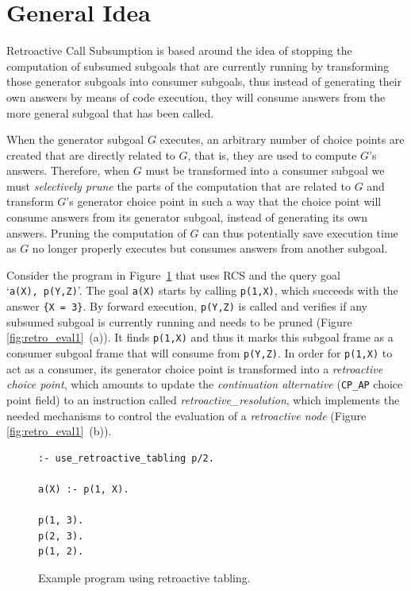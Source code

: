 \section{General Idea}

Retroactive Call Subsumption is based around the idea of stopping the computation of subsumed subgoals
that are currently running by transforming those generator subgoals into consumer subgoals, thus instead
of generating their own answers by means of code execution, they will consume answers from the more general
subgoal that has been called.

When the generator subgoal $G$ executes, an arbitrary number of choice points are created that are directly related
to $G$, that is, they are used to compute $G$'s answers. Therefore, when $G$
must be transformed into a consumer subgoal we must \textit{selectively prune} the parts of the computation
that are related to $G$ and transform $G$'s generator choice point in such a way that the choice point
will consume answers from its generator subgoal, instead of generating its own answers.
Pruning the computation of $G$ can thus potentially save execution time as $G$ no longer properly executes
but consumes answers from another subgoal.

Consider the program in Figure~\ref{fig:retro_program1} that uses RCS and the query goal `\texttt{a(X),~p(Y,Z)}'.
The goal \texttt{a(X)} starts by calling \texttt{p(1,X)}, which succeeds with the answer \texttt{\{X~=~3\}}.
By forward execution, \texttt{p(Y,Z)} is called and verifies if any subsumed subgoal is currently running
and needs to be pruned (Figure \ref{fig:retro_eval1}~(a)). It finds \texttt{p(1,X)} and thus it marks this subgoal frame as a consumer subgoal
frame that will consume from \texttt{p(Y,Z)}.
In order for \texttt{p(1,X)} to act as a consumer, its generator choice point is transformed into
a \textit{retroactive choice point}, which amounts to update the \textit{continuation alternative}
(\texttt{CP\_AP} choice point field) to an instruction called \textit{retroactive\_resolution},
which implements the needed mechanisms to control the evaluation of a \textit{retroactive node}
(Figure \ref{fig:retro_eval1}~(b)).

\begin{figure}[ht]
\begin{Verbatim}
:- use_retroactive_tabling p/2.

a(X) :- p(1, X).

p(1, 3).
p(2, 3).
p(1, 2).
\end{Verbatim}
\caption{Example program using retroactive tabling.}
\label{fig:retro_program1}
\end{figure}

